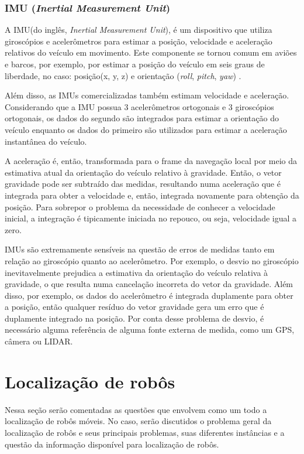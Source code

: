 \documentclass[acronym, symbols]{fei}
\begin{document}
			\subsubsection{IMU (\textit{Inertial Measurement Unit})}
			
				A IMU(do inglês, \textit{Inertial Measurement Unit}), é um dispositivo que utiliza giroscópios e acelerômetros para estimar a posição, velocidade e aceleração relativos do veículo em movimento. Este componente se tornou comum em aviões e barcos, por exemplo, por estimar a posição do veículo em seis graus de liberdade, no caso: posição(x, y, z) e orientação (\textit{roll}, \textit{pitch}, \textit{yaw}) \cite{siegwart2011introduction}.
				
				Além disso, as IMUs comercializadas também estimam velocidade e aceleração. Considerando que a IMU possua 3 acelerômetros ortogonais e 3 giroscópios ortogonais, os dados do segundo são integrados para estimar a orientação do veículo enquanto os dados do primeiro são utilizados para estimar a aceleração instantânea do veículo.
				
				A aceleração é, então, transformada para o frame da navegação local por meio da estimativa atual da orientação do veículo relativo à gravidade. Então, o vetor gravidade pode ser subtraído das medidas, resultando numa aceleração que é integrada para obter a velocidade e, então, integrada novamente para obtenção da posição. Para sobrepor o problema da necessidade de conhecer a velocidade inicial, a integração é tipicamente iniciada no repouco, ou seja, velocidade igual a zero.
				
				IMUs são extremamente sensíveis na questão de erros de medidas tanto em relação ao giroscópio quanto ao acelerômetro. Por exemplo, o desvio no giroscópio inevitavelmente prejudica a estimativa da orientação do veículo relativa à gravidade, o que resulta numa cancelação incorreta do vetor da gravidade. Além disso, por exemplo, os dados do acelerômetro é integrada duplamente para obter a posição, então qualquer resíduo do vetor gravidade gera um erro que é duplamente integrado na posição. Por conta desse problema de desvio, é necessário alguma referência de alguma fonte externa de medida, como um GPS, câmera ou LIDAR.
				
	\section{Localização de robôs}
	
		Nessa seção serão comentadas as questões que envolvem como um todo a localização de robôs móveis. No caso, serão discutidos o problema geral da localização de robôs e seus principais problemas, suas diferentes instâncias e a questão da informação disponível para localização de robôs.
		
\end{document}
